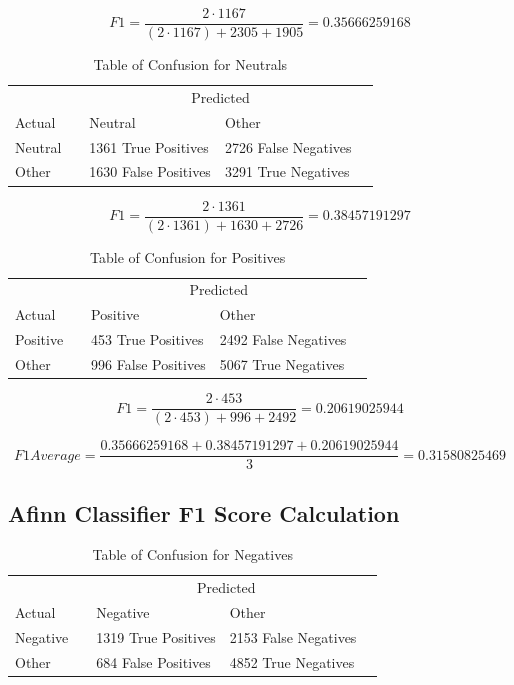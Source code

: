\[F1 = \dfrac{2\cdot1167}{(2\cdot1167) + 2305 + 1905} = 0.35666259168\]


\begin{table}[H]
	\begin{tabular}{@{}lllll@{}}
		\toprule
		& & \multicolumn{2}{c}{Predicted} \\\cmidrule{2-4}
		Actual & & Neutral & Other & \\ \midrule
		Neutral & & 1361 True Positives & 2726 False Negatives & \\
		Other  & & 1630 False Positives & 3291 True Negatives & \\ \bottomrule
	\end{tabular}
	\centering
	\caption{Table of Confusion for Neutrals}
	\label{randomneu}
\end{table}

\[F1 = \dfrac{2\cdot1361}{(2\cdot1361) + 1630 + 2726} = 0.38457191297\]


\begin{table}[H]
	\begin{tabular}{@{}lllll@{}}
		\toprule
		& & \multicolumn{2}{c}{Predicted} \\\cmidrule{2-4}
		Actual & & Positive & Other & \\ \midrule
		Positive & & 453 True Positives & 2492 False Negatives & \\
		Other  & & 996 False Positives & 5067 True Negatives & \\ \bottomrule
	\end{tabular}
	\centering
	\caption{Table of Confusion for Positives}
	\label{randompos}
\end{table}


\[F1 = \dfrac{2\cdot453}{(2\cdot453) + 996 + 2492} = 0.20619025944\]

\[F1 Average = \dfrac{0.35666259168+0.38457191297+0.20619025944}{3} = 0.31580825469\]

\subsection{Afinn Classifier F1 Score Calculation}

\begin{table}[H]
	\begin{tabular}{@{}lllll@{}}
		\toprule
		& & \multicolumn{2}{c}{Predicted} \\\cmidrule{2-4}
		Actual & & Negative & Other & \\ \midrule
		Negative & & 1319 True Positives & 2153 False Negatives & \\
		Other  & & 684 False Positives & 4852 True Negatives & \\ \bottomrule
	\end{tabular}
	\centering
	\caption{Table of Confusion for Negatives}
	\label{afinnneg}
\end{table}

